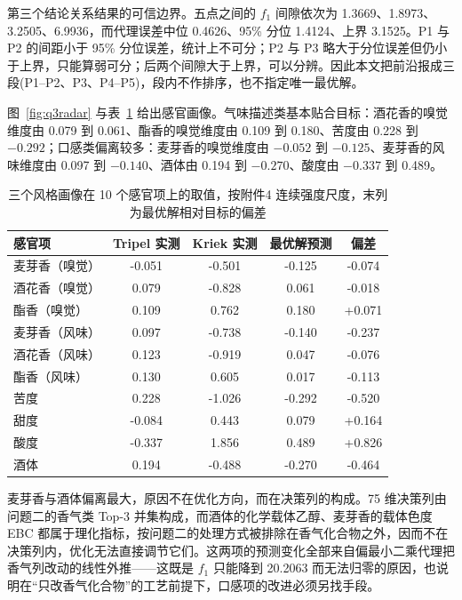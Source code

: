 第三个结论关系结果的可信边界。五点之间的 $f_1$ 间隙依次为 1.3669、1.8973、3.2505、6.9936，而代理误差中位 0.4626、95\% 分位 1.4124、上界 3.1525。P1 与 P2 的间距小于 95\% 分位误差，统计上不可分；P2 与 P3 略大于分位误差但仍小于上界，只能算弱可分；后两个间隙大于上界，可以分辨。因此本文把前沿报成三段(P1--P2、P3、P4--P5)，段内不作排序，也不指定唯一最优解。

图~\ref{fig:q3radar} 与表~\ref{tab:q3profile} 给出感官画像。气味描述类基本贴合目标：酒花香的嗅觉维度由 0.079 到 0.061、酯香的嗅觉维度由 0.109 到 0.180、苦度由 0.228 到 $-0.292$；口感类偏离较多：麦芽香的嗅觉维度由 $-0.052$ 到 $-0.125$、麦芽香的风味维度由 0.097 到 $-0.140$、酒体由 0.194 到 $-0.270$、酸度由 $-0.337$ 到 0.489。



\begin{table}[htbp]
\centering
\footnotesize
\caption{三个风格画像在 10 个感官项上的取值，按附件4 连续强度尺度，末列为最优解相对目标的偏差}
\label{tab:q3profile}
\begin{tabular*}{\textwidth}{@{\extracolsep{\fill}}lcccc@{}}
\toprule
\textbf{感官项} & \textbf{Tripel 实测} & \textbf{Kriek 实测} & \textbf{最优解预测} & \textbf{偏差} \\
\midrule
麦芽香（嗅觉） & -0.051 & -0.501 & -0.125 & -0.074 \\
酒花香（嗅觉） & 0.079 & -0.828 & 0.061 & -0.018 \\
酯香（嗅觉） & 0.109 & 0.762 & 0.180 & +0.071 \\
麦芽香（风味） & 0.097 & -0.738 & -0.140 & -0.237 \\
酒花香（风味） & 0.123 & -0.919 & 0.047 & -0.076 \\
酯香（风味） & 0.130 & 0.605 & 0.017 & -0.113 \\
苦度 & 0.228 & -1.026 & -0.292 & -0.520 \\
甜度 & -0.084 & 0.443 & 0.079 & +0.164 \\
酸度 & -0.337 & 1.856 & 0.489 & +0.826 \\
酒体 & 0.194 & -0.488 & -0.270 & -0.464 \\
\bottomrule
\end{tabular*}
\end{table}

麦芽香与酒体偏离最大，原因不在优化方向，而在决策列的构成。75 维决策列由问题二的香气类 Top-3 并集构成，而酒体的化学载体乙醇、麦芽香的载体色度 EBC 都属于理化指标，按问题二的处理方式被排除在香气化合物之外，因而不在决策列内，优化无法直接调节它们。这两项的预测变化全部来自偏最小二乘代理把香气列改动的线性外推——这既是 $f_1$ 只能降到 20.2063 而无法归零的原因，也说明在“只改香气化合物”的工艺前提下，口感项的改进必须另找手段。

